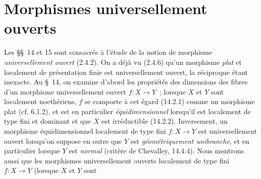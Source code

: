 
\section{Morphismes universellement ouverts}
\label{section:IV.14-fr}

Les \S\S~14 et 15 sont consacrés à l'étude de la notion de morphisme
\emph{universellement ouvert} (2.4.2). On a déjà vu (2.4.6) qu'un morphisme
\emph{plat} et localement de présentation finie est universellement ouvert, la
réciproque étant inexacte. Au \S~14, on examine d'abord les propriétés des
dimensions des fibres d'un morphisme universellement ouvert $f:X\to Y$~;
lorsque $X$ et $Y$ sont localement noethériens, $f$ se comporte à cet égard
(14.2.1) comme un morphisme plat (cf. 6.1.2), et est en particulier
\emph{équidimensionnel} lorsqu'il est localement de type fini et dominant et que
$X$ est irréductible (14.2.2). Inversement, un morphisme équidimensionnel
localement de type fini $f:X\to Y$ est universellement ouvert lorsqu'on suppose
en outre que $Y$ est \emph{géométriquement unibranche}, et en particulier lorsque
$Y$ est \emph{normal} (critère de Chevalley, 14.4.4). Nous montrons aussi que les
morphismes universellement ouverts localement de type fini $f:X\to Y$ (lorsque
$X$ et $Y$ sont
